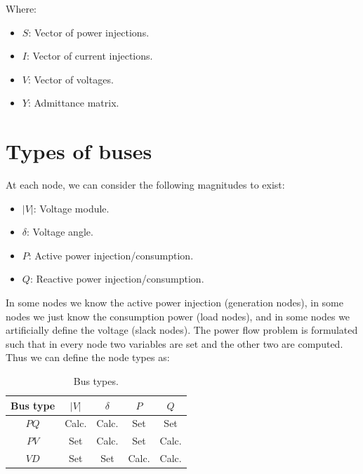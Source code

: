 \documentclass[a4paper,twoside,fleqn]{tufte-book}
\begin{document}
Where:

\begin{itemize}
\item $S$: Vector of power injections.
\item $I$: Vector of current injections.
\item $V$: Vector of voltages.
\item $Y$: Admittance matrix.
\end{itemize}


\section{Types of buses}

At each node, we can consider the following magnitudes to exist:
\begin{itemize}
	\item $|V|$: Voltage module.
	\item $\delta$: Voltage angle.
	\item $P$: Active power injection/consumption.
	\item $Q$: Reactive power injection/consumption.
\end{itemize}

In some nodes we know the active power injection (generation nodes), in some nodes we just know the consumption power (load nodes), and in some nodes we artificially define the voltage (slack nodes). The power flow problem is formulated such that in every node two variables are set and the other two are computed. Thus we can define the node types as:

\begin{table}[h!]
	\begin{center}
		\begin{tabular}{ccccc}
			\toprule
			
			Bus type & $|V|$ &  $\delta$ & $P$ & $Q$\\
			
			\midrule
			
			$PQ$ & Calc. &  Calc. & Set & Set\\
			$PV$ & Set &  Calc. & Set & Calc.\\
			$VD$ & Set &  Set & Calc. & Calc.\\
			
			
			\bottomrule
		\end{tabular}
	\end{center}
	\caption{Bus types.}
	\label{bus__types}
\end{table}
\end{document}
